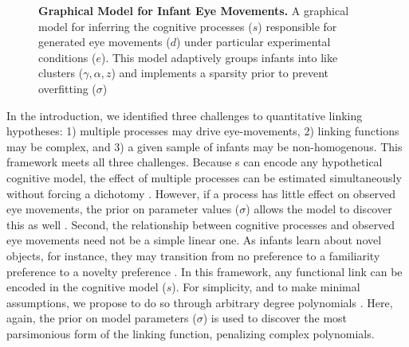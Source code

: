 \documentclass[12pt]{article}
\begin{document}
\begin{figure}[!h]
\caption{\textbf{Graphical Model for Infant Eye Movements.} A graphical model for inferring the cognitive processes ($s$) responsible for generated eye movements ($d$) under particular experimental conditions ($e$). This model adaptively groups infants into like clusters ($\gamma, \alpha, z$) and implements a sparsity prior to prevent overfitting ($\sigma$)}
\label{fig:plates}
\end{figure}

	In the introduction, we identified three challenges to quantitative linking hypotheses: 1) multiple processes may drive eye-movements, 2) linking functions may be complex, and 3) a given sample of infants may be non-homogenous. This framework meets all three challenges. Because s can encode any hypothetical cognitive model, the effect of multiple processes can be estimated simultaneously without forcing a dichotomy \cite{Newell1973, Anderson2011}.  However, if a process has little effect on observed eye movements, the prior on parameter values ($\sigma$) allows the model to discover this as well \cite{Figuerido2002}. Second, the relationship between cognitive processes and observed eye movements need not be a simple linear one. As infants learn about novel objects, for instance, they may transition from no preference to a familiarity preference to a novelty preference \cite{Hunter1988, Cohen2004}. In this framework, any functional link can be encoded in the cognitive model ($s$). For simplicity, and to make minimal assumptions, we propose to do so through arbitrary degree polynomials \cite{Barr2008, Jackson2009}. Here, again, the prior on model parameters ($\sigma$) is used to discover the most parsimonious form of the linking function, penalizing complex polynomials.
\end{document}
